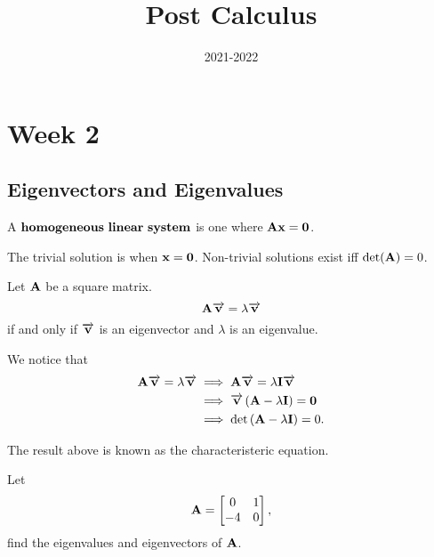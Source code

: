 \documentclass[12pt]{scrartcl}
\title{Post Calculus}
\date{2021-2022}
\begin{document}
\maketitle
\tableofcontents
\newpage

\section{Week 2}
\subsection{Eigenvectors and Eigenvalues}
\begin{definition}
    A $\bold{homogeneous ~linear ~ system}$ is one where $\bold{Ax} = \bold{0}$.
\end{definition}

\noindent{}The trivial solution is when $\bold{x} = \bold{0}$. Non-trivial solutions exist iff $\det(\bold{A}) = 0$.

\begin{theorem}
    Let $\bold{A}$ be a square matrix. $$\bold{A\overrightarrow{\bold{v}}} = \lambda \overrightarrow{\bold{v}}$$
    if and only if $\overrightarrow{\bold{v}}$ is an eigenvector and $\lambda$ is an eigenvalue.
\end{theorem}

We notice that 
\begin{align*}
    \bold{A}\overrightarrow{\bold{v}} = \lambda\overrightarrow{\bold{v}} &\implies \bold{A}\overrightarrow{\bold{v}} = \lambda \bold{I} \overrightarrow{\bold{v}} \\
    &\implies \overrightarrow{\bold{v}} \left(\bold{A} - \lambda \bold{I} \right) = \bold{0} \\
    &\implies \det \left(\bold{A} - \lambda \bold{I} \right) = 0.
\end{align*}

The result above is known as the \alert{characteristeric equation}.

\begin{example}
    Let $$\bold{A} = \begin{bmatrix} 0 & 1 \\ -4 & 0 \end{bmatrix},$$
    find the eigenvalues and eigenvectors of $\bold{A}$.
\end{example}
\end{document}
